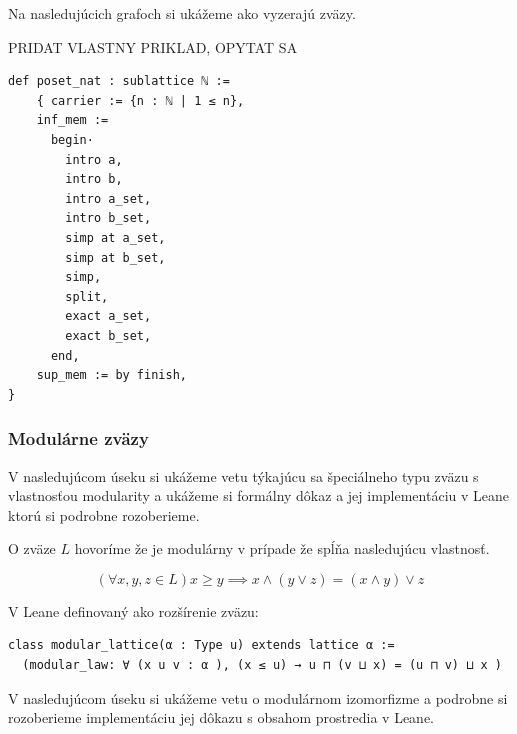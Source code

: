 \documentclass[a4paper,10pt,oneside]{report}%
\begin{document}
Na nasledujúcich grafoch si ukážeme ako vyzerajú zväzy.

PRIDAT VLASTNY PRIKLAD, OPYTAT SA
\begin{lstlisting}
def poset_nat : sublattice ℕ :=
    { carrier := {n : ℕ | 1 ≤ n},
    inf_mem :=
      begin·
        intro a,
        intro b,
        intro a_set,
        intro b_set,
        simp at a_set,
        simp at b_set,
        simp,
        split,
        exact a_set,
        exact b_set,
      end,
    sup_mem := by finish,
}
\end{lstlisting}

\subsubsection{Modulárne zväzy}

V nasledujúcom úseku si ukážeme vetu týkajúcu sa špeciálneho typu zväzu s vlastnosťou
    modularity a ukážeme si formálny dôkaz a jej implementáciu v Leane  ktorú si
    podrobne rozoberieme.

O zväze $L$ hovoríme že je modulárny v prípade že spĺňa nasledujúcu vlastnosť.

\begin{equation*}
    (\forall x,y,z \in L) x \geq y \implies x \wedge ( y \vee z) = (x \wedge y) \vee z
\end{equation*}

V Leane definovaný ako rozšírenie zväzu:

\begin{lstlisting}
class modular_lattice(α : Type u) extends lattice α :=
  (modular_law: ∀ (x u v : α ), (x ≤ u) → u ⊓ (v ⊔ x) = (u ⊓ v) ⊔ x )
\end{lstlisting}

V nasledujúcom úseku si ukážeme vetu o modulárnom izomorfizme a podrobne
    si rozoberieme implementáciu jej dôkazu s obsahom prostredia v Leane.
\end{document}
